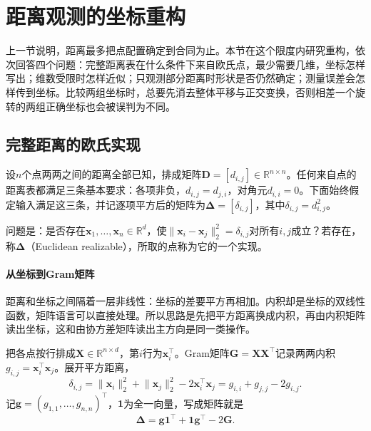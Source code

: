 \section{距离观测的坐标重构}
\label{sec:smap-distance-reconstruction}

上一节说明，距离最多把点配置确定到合同为止。本节在这个限度内研究重构，依次回答四个问题：完整距离表在什么条件下来自欧氏点，最少需要几维，坐标怎样写出；维数受限时怎样近似；只观测部分距离时形状是否仍然确定；测量误差会怎样传到坐标。比较两组坐标时，总要先消去整体平移与正交变换，否则相差一个旋转的两组正确坐标也会被误判为不同。

\subsection{完整距离的欧氏实现}
\label{sec:smap-full-distance}

设$n$个点两两之间的距离全部已知，排成矩阵$\bm D=[d_{i,j}]\in\mathbb R^{n\times n}$。任何来自点的距离表都满足三条基本要求：各项非负，$d_{i,j}=d_{j,i}$，对角元$d_{i,i}=0$。下面始终假定输入满足这三条，并记逐项平方后的矩阵为$\bm\Delta=[\delta_{i,j}]$，其中$\delta_{i,j}=d_{i,j}^2$。

问题是：是否存在$\bm x_1,\ldots,\bm x_n\in\mathbb R^d$，使$\lVert\bm x_i-\bm x_j\rVert_2^2=\delta_{i,j}$对所有$i,j$成立？若存在，称$\bm\Delta$（Euclidean realizable），所取的点称为它的一个实现。

\paragraph{从坐标到Gram矩阵}

距离和坐标之间隔着一层非线性：坐标的差要平方再相加。内积却是坐标的双线性函数，矩阵语言可以直接处理。所以思路是先把平方距离换成内积，再由内积矩阵读出坐标，这和由协方差矩阵读出主方向是同一类操作。

把各点按行排成$\bm X\in\mathbb R^{n\times d}$，第$i$行为$\bm x_i^\top$。Gram矩阵$\bm G=\bm X\bm X^\top$记录两两内积$g_{i,j}=\bm x_i^\top\bm x_j$。展开平方距离，
\begin{equation}
 \delta_{i,j}=\lVert\bm x_i\rVert_2^2+\lVert\bm x_j\rVert_2^2-2\bm x_i^\top\bm x_j=g_{i,i}+g_{j,j}-2g_{i,j}.
 \label{eq:smap-distance-gram}
\end{equation}
记$\bm g=(g_{1,1},\ldots,g_{n,n})^\top$，$\bm1$为全一向量，写成矩阵就是
\begin{equation}
 \bm\Delta=\bm g\bm1^\top+\bm1\bm g^\top-2\bm G .
 \label{eq:smap-distance-gram-matrix}
\end{equation}

